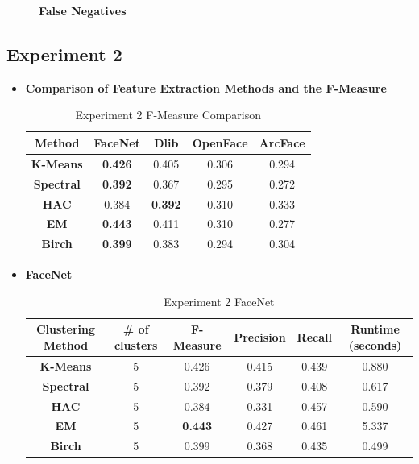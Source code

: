 \documentclass[12pt,english]{article}
\begin{document}
\begin{figure}[H]
\begin{minipage}[b]{0.4\textwidth}
    \caption{\textbf{False Negatives}}
    \label{fig:ex1fn}
  \end{minipage}
\end{figure}

\subsection{Experiment 2}

\begin{itemize}
\item \textbf{Comparison of Feature Extraction Methods and the F-Measure}
\begin{table}[H]
\centering
\begin{tabular}{||c c c c c||} 
 \hline
Method & FaceNet & Dlib & OpenFace & ArcFace\\ [0.5ex]
 \hline\hline
 \textbf{K-Means} & \textbf{0.426} & 0.405 & 0.306 & 0.294\\ 
 \hline
  \textbf{Spectral} & \textbf{0.392} & 0.367 & 0.295 & 0.272\\
 \hline
 \textbf{HAC} & 0.384 & \textbf{0.392} & 0.310 & 0.333\\
 \hline
 \textbf{EM} & \textbf{0.443} & 0.411 & 0.310 & 0.277\\
 \hline
 \textbf{Birch} & \textbf{0.399} & 0.383 & 0.294 & 0.304\\
 \hline
\end{tabular}
\caption{Experiment 2 F-Measure Comparison}
\label{table:ex2}
\end{table}
\item \textbf{FaceNet}
\begin{table}[H]
\centering
\begin{tabular}{||c c c c c c||} 
 \hline
 Clustering Method & \# of clusters & F-Measure & Precision & Recall & Runtime (seconds)\\ [0.5ex]
 \hline\hline
 \textbf{K-Means} & 5 & 0.426 & 0.415 & 0.439 & 0.880\\ 
 \hline
  \textbf{Spectral} & 5 & 0.392 & 0.379 & 0.408 & 0.617\\
 \hline
 \textbf{HAC} & 5 & 0.384 & 0.331 & 0.457 & 0.590\\
 \hline
 \textbf{EM} & 5 & \textbf{0.443} & 0.427 & 0.461 & 5.337\\
 \hline
 \textbf{Birch} & 5 & 0.399 & 0.368 & 0.435 & 0.499\\
 \hline
\end{tabular}
\caption{Experiment 2 FaceNet}
\label{table:ex2facenet}
\end{table}


\end{itemize}
\end{document}
